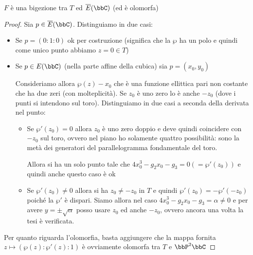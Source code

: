 \begin{proposizione}
  $F$ è una bigezione tra $T$ ed $\ol{E}(\bbC)$ (ed è olomorfa)
\end{proposizione}
\begin{proof}
  Sia $p \in \ol{E}(\bbC)$. Distinguiamo in due casi:
  \begin{itemize}
  \item Se $p = (0 : 1 : 0)$ ok per costruzione (significa che la $\wp$
    ha un polo e quindi come unico punto abbiamo $z = 0 \in T$)
  \item Se $p \in E(\bbC)$ (nella parte affine della cubica) sia $p =
    (x_0, y_0)$

    Consideriamo allora $\wp(z) - x_0$ che è una funzione ellittica pari
    non costante che ha due zeri (con molteplicità). Se $z_0$ è uno zero
    lo è anche $- z_0$ (dove i punti si intendono sul
    toro). Distinguiamo in due casi a seconda della derivata nel punto:
    \begin{itemize}
    \item Se $\wp'(z_0) = 0$ allora $z_0$ è uno zero doppio e deve
      quindi coincidere con $-z_0$ sul toro, ovvero nel piano ho
      solamente quattro possibilità: sono la metà dei generatori del
      parallelogramma fondamentale del toro.


      Allora si ha un solo punto tale che $4x_0^3 - g_2 x_0 - g_3 = 0 (=
      \wp'(z_0))$ e quindi anche questo caso è ok
    \item Se $\wp'(z_0) \neq 0$ allora si ha $z_0 \neq - z_0$ in $T$ e
      quindi $\wp'(z_0) = - \wp'(-z_0)$ poiché la $\wp'$ è
      dispari. Siamo allora nel caso $4x_0^3 - g_2 x_0 - g_3 = \alpha
      \neq 0$ e per avere $y = \pm \sqrt{\alpha}$ posso usare $z_0$ ed
      anche $-z_0$, ovvero ancora una volta la tesi è verificata.
    \end{itemize}
  \end{itemize}

  Per quanto riguarda l'olomorfia, basta aggiungere che la mappa fornita
  $z \mapsto (\wp(z) : \wp'(z) : 1)$ è ovviamente olomorfa tra $T$ e
  $\bbP^2 \bbC$
\end{proof}

